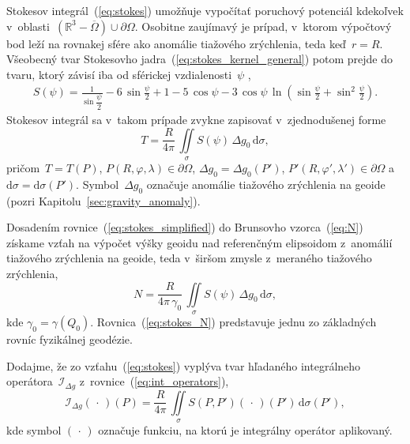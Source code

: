\documentclass[a4paper, 12pt]{book}
\newcommand{\diff}{\mathrm d}
\begin{document}
Stokesov integrál~(\ref{eq:stokes}) umožňuje vypočítať poruchový potenciál 
kdekoľvek v~oblasti~$\left( \mathbb{R}^3 - \overline\Omega\right) \cup 
\partial\Omega$.  Osobitne zaujímavý je prípad, v~ktorom výpočtový bod leží na 
rovnakej sfére ako anomálie tiažového zrýchlenia, teda keď~$r = R$.  Všeobecný 
tvar Stokesovho jadra~(\ref{eq:stokes_kernel_general}) potom prejde do tvaru, 
ktorý závisí iba od sférickej vzdialenosti~$\psi$ 
\parencite{MoritzPhysicalGeodesy},
%
\begin{equation}
\label{eq:stokes_kernel}
\begin{split}
S(\psi) = \frac{1}{\sin\dfrac{\psi}{2}} - 6 \, \sin\frac{\psi}{2} + 1 - 5 \, 
\cos\psi - 3 \, \cos\psi \, \ln\left( \sin\frac{\psi}{2} + \sin^2\frac{\psi}{2} 
\right){.}
\end{split}
\end{equation}
%
Stokesov integrál sa v~takom prípade zvykne zapisovať v~zjednodušenej forme
%
\begin{equation}
\label{eq:stokes_simplified}
T = \frac{R}{4\pi} \, \iint\limits_{\sigma} S(\psi) \, \Delta g_0 \, \diff 
\sigma{,}
\end{equation}
%
pričom~$T = T(P)$, $P(R, \varphi, \lambda) \in \partial\Omega$, $\Delta g_0 
= \Delta g_0(P')$, $P'(R, \varphi', \lambda') \in \partial\Omega$ 
a~$\diff\sigma = \diff\sigma(P')$.  Symbol~$\Delta g_0$ označuje anomálie 
tiažového zrýchlenia na geoide (pozri Kapitolu~\ref{sec:gravity_anomaly}).

Dosadením rovnice~(\ref{eq:stokes_simplified}) do Brunsovho vzorca~(\ref{eq:N}) 
získame vzťah na výpočet výšky geoidu nad referenčným elipsoidom z~anomálií 
tiažového zrýchlenia na geoide, teda v~širšom zmysle z~meraného tiažového 
zrýchlenia,
%
\begin{equation}
\label{eq:stokes_N}
N = \frac{R}{4\pi \, \gamma_0} \, \iint\limits_{\sigma} S(\psi) \, \Delta g_0 
\, \diff \sigma{,}
\end{equation}
%
kde $\gamma_0 = \gamma(Q_0)$.  Rovnica~(\ref{eq:stokes_N}) predstavuje jednu zo 
základných rovníc fyzikálnej geodézie.

Dodajme, že zo vzťahu~(\ref{eq:stokes}) vyplýva tvar hľadaného integrálneho 
operátora~$\mathcal{I}_{\Delta g}$ z~rovnice~(\ref{eq:int_operators}),
%
\begin{equation}
\label{eq:iDg}
\mathcal{I}_{\Delta g}( \, \cdot \, )(P) = \frac{R}{4\pi} \, 
\iint\limits_\sigma S(P, P') ( \, \cdot \, )(P') \, \diff\sigma(P'){,}
\end{equation}
%
kde symbol $(\, \cdot \,)$ označuje funkciu, na ktorú je integrálny operátor 
aplikovaný.
\end{document}
